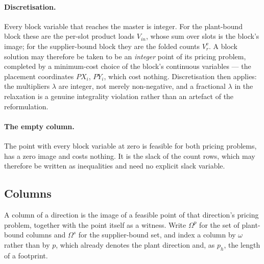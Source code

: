 \paragraph{Discretisation.}
Every block variable that reaches the master is integer. For the
plant-bound block these are the per-slot product loads $V_{in}$, whose
sum over slots is the block's image; for the supplier-bound block they
are the folded counts $V^{\mathrm{e}}_{r}$. A block solution may
therefore be taken to be an \emph{integer} point of its pricing
problem, completed by a minimum-cost choice of the block's continuous
variables --- the placement coordinates $PX_{i}$, $PY_{i}$, which cost
nothing. Discretisation then applies: the multipliers $\lambda$ are
integer, not merely non-negative, and a fractional $\lambda$ in the
relaxation is a genuine integrality violation rather than an artefact
of the reformulation.

\paragraph{The empty column.}
The point with every block variable at zero is feasible for both
pricing problems, has a zero image and costs nothing. It is the slack
of the count rows, which may therefore be written as inequalities and
need no explicit slack variable.

\subsection{Columns}
\label{sec:columns}

A column of a direction is the image of a feasible point of that
direction's pricing problem, together with the point itself as a
witness. Write $\Omega^{p}$ for the set of plant-bound columns and
$\Omega^{s}$ for the supplier-bound set, and index a column by $\omega$
rather than by $p$, which already denotes the plant direction and, as
$p_{h}$, the length of a footprint.

